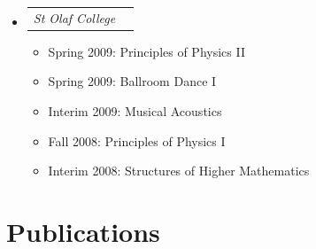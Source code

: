 \documentclass[12pt,letterpaper]{article}
\makeatletter
\newcommand{\headerpair}[2]{
    \begin{tabular*}{\linewidth}{l@{ \extracolsep{\fill} }r} {\large\emph{#1}} & {\large\emph{#2}}
    \end{tabular*}
}
\newcommand{\ResumeSection}[1]{\section*{{\color{MidnightBlue}#1 \sout{\hfill}}}}
\makeatother
\begin{document}
\begin{itemize}[leftmargin=\parindent]
    \item[]
        \headerpair{St Olaf College}{}
        \begin{itemize}[leftmargin=\parindent]
            \item Spring 2009: Principles of Physics II
            \item Spring 2009: Ballroom Dance I
            \item Interim 2009: Musical Acoustics
            \item Fall 2008: Principles of Physics I
            \item Interim 2008: Structures of Higher Mathematics
        \end{itemize}

\end{itemize}


\ResumeSection{Publications}
\end{document}

